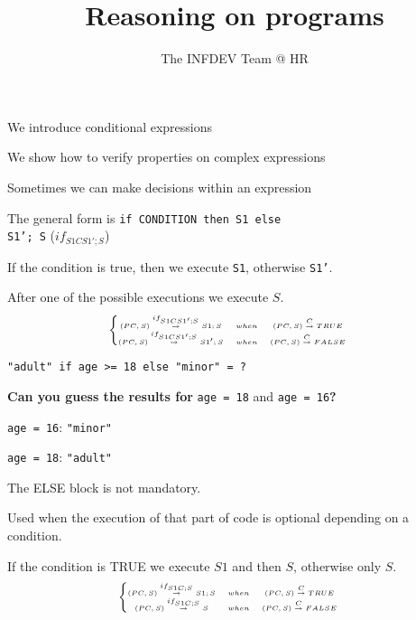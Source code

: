 \documentclass{beamer}
\title{Reasoning on programs}
\author{The INFDEV Team @ HR}
\institute{Hogeschool Rotterdam \\ 
Rotterdam, Netherlands}
\date{}
\begin{document}
\maketitle

\begin{slide}{
\item We introduce conditional expressions
\item We show how to verify properties on complex expressions
}\end{slide}

\begin{slide}{
\item Sometimes we can make decisions within an expression
\item The general form is \texttt{if CONDITION then S1 else\\ S1'; S} ($if_{S1CS1';S}$)
\item If the condition is true, then we execute \texttt{S1}, otherwise \texttt{S1'}.
\item After one of the possible executions we execute $S$.
$$
\tiny
\left\{
\begin{matrix}
(PC,S) \overset{if_{S1CS1';S}}{\rightarrow} S1;S &when& (PC,S) \overset{C}{\rightarrow} TRUE & \\
(PC,S) \overset{if_{S1CS1';S}}{\rightarrow} S1';S &when& (PC,S) \overset{C}{\rightarrow} FALSE & \\
\end{matrix}
\right.
$$
}\end{slide}

\begin{slide}{
\item \texttt{"adult" if age >= 18 else "minor" = ?}
\item \textbf{Can you guess the results for} \texttt{age = 18} and \texttt{age = 16}\textbf{?}
\pause
\item \texttt{age = 16}: \texttt{"minor"}
\item \texttt{age = 18}: \texttt{"adult"}
}\end{slide}

\begin{slide}{
\item The ELSE block is not mandatory.
\item Used when the execution of that part of code is optional depending on a condition.
\item If the condition is TRUE we execute $S1$ and then $S$, otherwise only $S$.
$$
\tiny
\left\{
\begin{matrix}
(PC,S) \overset{if_{S1C;S}}{\rightarrow} S1;S &when& (PC,S) \overset{C}{\rightarrow} TRUE & \\
(PC,S) \overset{if_{S1C;S}}{\rightarrow} S &when& (PC,S) \overset{C}{\rightarrow} FALSE & \\
\end{matrix}
\right.
$$
}\end{slide}
\end{document}
